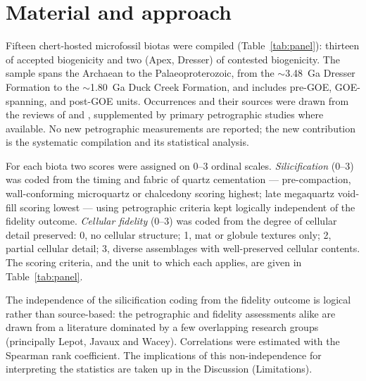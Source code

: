 \documentclass[11pt]{article}
\begin{document}
\section{Material and approach}

Fifteen chert-hosted microfossil biotas were compiled (Table~\ref{tab:panel}): thirteen of accepted
biogenicity and two (Apex, Dresser) of contested biogenicity. The sample spans the Archaean to the
Palaeoproterozoic, from the $\sim$3.48~Ga Dresser Formation to the $\sim$1.80~Ga Duck Creek
Formation, and includes pre-GOE, GOE-spanning, and post-GOE units. Occurrences and their sources
were drawn from the reviews of \citet{Javaux2018} and \citet{Wacey2014}, supplemented by primary
petrographic studies where available. No new petrographic measurements are reported; the new
contribution is the systematic compilation and its statistical analysis.

For each biota two scores were assigned on 0--3 ordinal scales. \emph{Silicification} (0--3) was
coded from the timing and fabric of quartz cementation --- pre-compaction, wall-conforming
microquartz or chalcedony scoring highest; late megaquartz void-fill scoring lowest --- using
petrographic criteria kept logically independent of the fidelity outcome. \emph{Cellular fidelity}
(0--3) was coded from the degree of cellular detail preserved: 0, no cellular structure; 1, mat or
globule textures only; 2, partial cellular detail; 3, diverse assemblages with well-preserved
cellular contents. The scoring criteria, and the unit to which each applies, are given in
Table~\ref{tab:panel}.

The independence of the silicification coding from the fidelity outcome is logical rather than
source-based: the petrographic and fidelity assessments alike are drawn from a literature dominated
by a few overlapping research groups (principally Lepot, Javaux and Wacey). Correlations were
estimated with the Spearman rank coefficient. The implications of this non-independence for
interpreting the statistics are taken up in the Discussion (Limitations).
\end{document}
